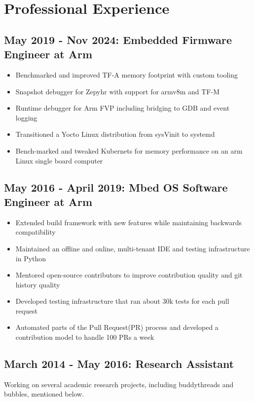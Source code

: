 \documentclass[letterpaper,12pt]{resume}
\begin{document}
\section{Professional Experience}
\subsection{May 2019 - Nov 2024: Embedded Firmware Engineer at Arm}
\begin{itemize}
  \item
    Benchmarked and improved TF-A memory footprint with custom tooling
  \item
    Snapshot debugger for Zepyhr with support for armv8m and TF-M
  \item
    Runtime debugger for Arm FVP including bridging to GDB and event logging
  \item
    Transitioned a Yocto Linux distribution from sysVinit to systemd
  \item
    Bench-marked and tweaked Kubernets for memory performance on an arm Linux single board computer
\end{itemize}
\subsection{May 2016 - April 2019: Mbed OS Software Engineer at Arm}
\begin{itemize}
  \item
    Extended build framework with new features while maintaining backwards compatibility
  \item
    Maintained an offline and online, multi-tenant IDE and testing infrastructure in Python
  \item
    Mentored open-source contributors to improve contribution quality and git history quality 
  \item
    Developed testing infrastructure that ran about 30k tests for each pull request
  \item
    Automated parts of the Pull Request(PR) process and developed a contribution model to handle 100 PRs a week
\end{itemize}

\subsection{March 2014 - May 2016: Research Assistant}
Working on several academic research projects, including buddythreads and
bubbles, mentioned below.
\end{document}

